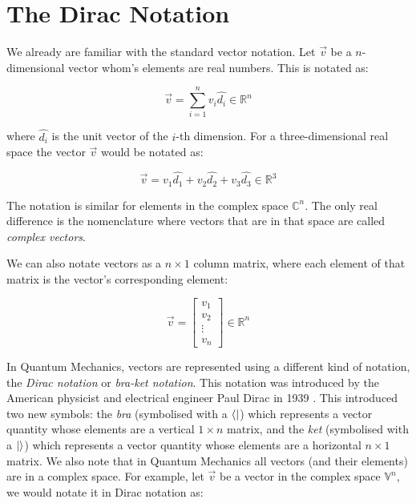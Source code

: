 \section{The Dirac Notation}

We already are familiar with the standard vector notation. Let $\vec{v}$ be a $n$-dimensional vector
whom's elements are real numbers. This is notated as:

\begin{equation}
    \vec{v}=\sum_{i=1}^{n}v_i\hat{d_i}\in\mathbb{R}^n
\end{equation}

where $\hat{d_i}$ is the unit vector of the $i$-th dimension. For a three-dimensional
real space the vector $\vec{v}$ would be notated as:

\begin{equation}
    \vec{v}=v_1\hat{d_1}+v_2\hat{d_2}+v_3\hat{d_3}\in\mathbb{R}^3
\end{equation}

The notation is similar for elements in the complex space $\mathbb{C}^n$. The only real difference
is the nomenclature where vectors that are in that space are called \textit{complex vectors}.

We can also notate vectors as a $n\times1$ column matrix, where each element of that matrix
is the vector's corresponding element:

\begin{equation}
    \vec{v}=\begin{bmatrix}
        v_1\\
        v_2\\
        \vdots\\
        v_n
    \end{bmatrix}\in\mathbb{R}^n
\end{equation}

In Quantum Mechanics, vectors are represented using a different kind of notation, the \textit{Dirac notation}
or \textit{bra-ket notation}. This notation was introduced by the American physicist and electrical engineer Paul
Dirac in 1939 \cite{Dirac1939}. This introduced two new symbols: the \textit{bra} (symbolised with a $\bra{}$)
which represents a vector quantity whose elements are a vertical $1\times n$ matrix, and the \textit{ket}
(symbolised with a $\ket{}$) which represents a vector quantity whose elements are a horizontal $n\times1$ matrix.
We also note that in Quantum Mechanics all vectors (and their elements) are in a complex space. For example,
let $\vec{v}$ be a vector in the complex space $\mathbb{V}^n$, we would notate it in Dirac notation as:

